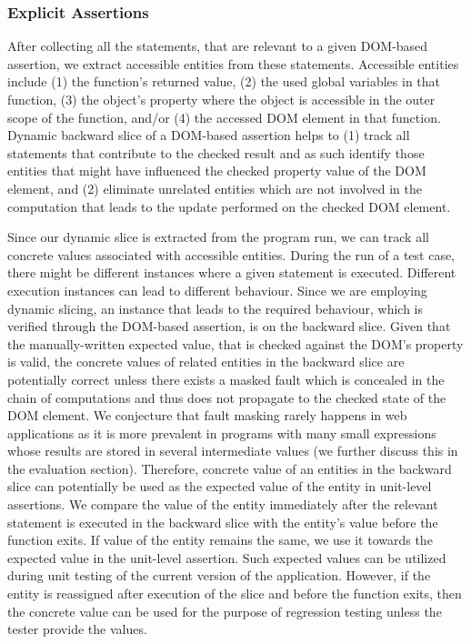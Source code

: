 \subsubsection{Explicit Assertions} \label{Sec:explicitAssertions}
After collecting all the statements, that are relevant to a given DOM-based assertion, we extract accessible entities from these statements.
Accessible entities include (1) the function's returned value, (2) the used global variables in that function, (3) the object's property where the object is accessible in the outer scope of the function, and/or (4) the accessed DOM element in that function. Dynamic backward slice of a DOM-based assertion helps to (1) track all statements that contribute to the checked result and as such identify those entities that might have influenced the checked property value of the DOM element, and (2) eliminate unrelated entities which are not involved in the computation that leads to the update performed on the checked DOM element.

Since our dynamic slice is extracted from the program run, we can track all concrete values associated with accessible entities.
During the run of a test case, there might be different instances where a given statement is executed. Different execution instances can lead to different behaviour. Since we are employing dynamic slicing, an instance that leads to the required behaviour, which is verified through the DOM-based assertion, is on the backward slice. Given that the manually-written expected value, that is checked against the DOM's property is valid, the concrete values of related entities in the backward slice are potentially correct unless there exists a masked fault which is concealed in the chain of computations and thus does not propagate to the checked state of the DOM element. We conjecture that fault masking rarely happens in \javascript web applications as it is more prevalent in programs with many small expressions whose results are stored in several intermediate values (we further discuss this in the evaluation section). Therefore, concrete value of an entities in the backward slice can potentially be used as the expected value of the entity in unit-level assertions.
We compare the value of the entity immediately after the relevant statement is executed in the backward slice with the entity's value before the function exits. If value of the entity remains the same, we use it towards the expected value in the unit-level assertion. Such expected values can be utilized during unit testing of the current version of the application. However, if the entity is reassigned after execution of the slice and before the function exits, then the concrete value can be used for the purpose of regression testing unless the tester provide the values.  
  

